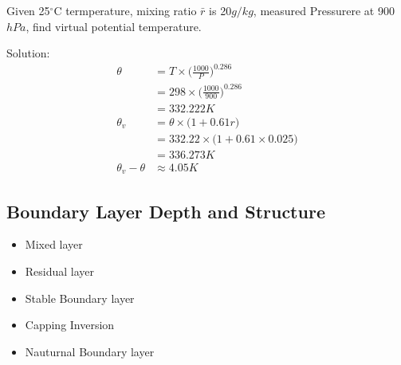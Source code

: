 \documentclass[fleqn,10pt]{SelfArx} %
\begin{document}
\begin{question}{}
	Given 25$^\circ$C termperature, mixing ratio $\bar{r}$ is 20$g/kg$, measured Pressurere at 900$hPa$, find virtual potential temperature.
\end{question}
\begin{answer}{}
	Solution:\begin{align*}
		\theta            & = T \times \Big(\frac{1000}{P}\Big)^{0.286}      \\
		                  & = 298 \times \Big(\frac{1000}{900}\Big)^{0.286}  \\
		                  & = 332.222 K                                      \\
		\theta_v          & = \theta \times \big(1 + 0.61r \big)             \\
		                  & = 332.22 \times \big(1 + 0.61 \times 0.025 \big) \\
		                  & = 336.273 K                                      \\
		\theta_v - \theta & \approx 4.05 K
	\end{align*}
\end{answer}

\subsection{Boundary Layer Depth and Structure}
\begin{itemize}[noitemsep]
	\item Mixed layer
	\item Residual layer
	\item Stable Boundary layer
	\item Capping Inversion
	\item Nauturnal Boundary layer
\end{itemize}
\end{document}
